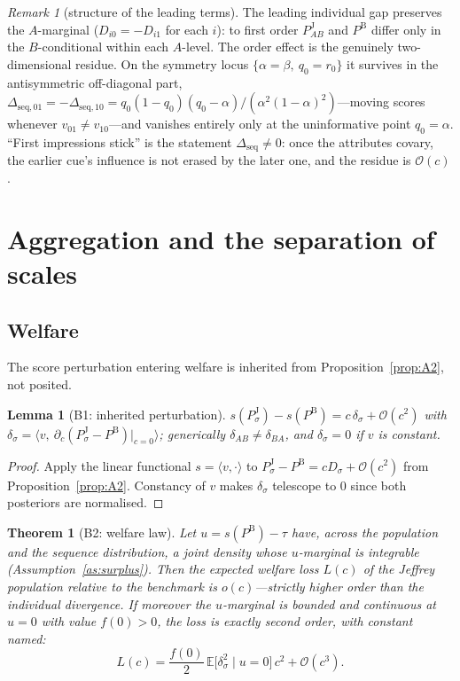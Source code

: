\documentclass[review,12pt,authoryear]{elsarticle}
\newtheorem{lemma}{Lemma}
\newtheorem{theorem}{Theorem}
\theoremstyle{remark}
\newtheorem{remark}{Remark}
\theoremstyle{definition}
\newcommand{\PB}{P^{\mathrm{B}}}
\newcommand{\PJ}{P^{\mathrm{J}}}
\newcommand{\E}{\mathbb{E}}
\newcommand{\bigO}{\mathcal{O}}
\newcommand{\vv}{v}
\newcommand{\anchor}[1]{}
\begin{document}
\begin{remark}[structure of the leading terms]\label{rem:structure}
The leading individual gap preserves the $A$-marginal ($D_{i0}=-D_{i1}$ for each $i$): to first
order $\PJ_{AB}$ and $\PB$ differ only in the $B$-conditional within each $A$-level. The order
effect is the genuinely two-dimensional residue. On the symmetry locus
$\{\alpha=\beta,\ q_0=r_0\}$ it survives in the antisymmetric off-diagonal part,
$\Delta_{\mathrm{seq},01}=-\Delta_{\mathrm{seq},10}
=q_0(1-q_0)(q_0-\alpha)/(\alpha^{2}(1-\alpha)^{2})$---moving scores whenever
$v_{01}\neq v_{10}$---and vanishes entirely only at the uninformative point $q_0=\alpha$.
``First impressions stick'' is the statement $\Delta_{\mathrm{seq}}\neq0$: once the attributes
covary, the earlier cue's influence is not erased by the later one, and the residue is
$\bigO(c)$. \anchor{Prop.~A2}
\end{remark}


\section{Aggregation and the separation of scales}
\label{sec:aggregation}

\subsection{Welfare}
\label{sec:welfare}

The score perturbation entering welfare is inherited from Proposition~\ref{prop:A2}, not
posited.

\begin{lemma}[B1: inherited perturbation]\label{lem:B1}
$s(\PJ_\sigma)-s(\PB)=c\,\delta_\sigma+\bigO(c^{2})$ with
$\delta_\sigma=\big\langle\vv,\ \partial_c(\PJ_\sigma-\PB)|_{c=0}\big\rangle$; generically
$\delta_{AB}\neq\delta_{BA}$, and $\delta_\sigma=0$ if $\vv$ is constant. \anchor{Lem.~B1}
\end{lemma}

\begin{proof}
Apply the linear functional $s=\langle\vv,\cdot\rangle$ to
$\PJ_\sigma-\PB=cD_\sigma+\bigO(c^2)$ from Proposition~\ref{prop:A2}. Constancy of $\vv$ makes
$\delta_\sigma$ telescope to $0$ since both posteriors are normalised.
\end{proof}

\begin{theorem}[B2: welfare law]\label{thm:B2}
Let $u=s(\PB)-\tau$ have, across the population and the sequence distribution, a joint density
whose $u$-marginal is integrable (Assumption~\ref{as:surplus}). Then the expected welfare loss $L(c)$ of the Jeffrey
population relative to the benchmark is $o(c)$---strictly higher order than the individual
divergence. If moreover the $u$-marginal is bounded and continuous at $u=0$ with value
$f(0)>0$, the loss is exactly second order, with constant named:
\[
  L(c)=\frac{f(0)}{2}\,\E\!\big[\delta_\sigma^{2}\mid u=0\big]\,c^{2}+\bigO(c^{3}).
\]
\anchor{Thm.~B2}
\end{theorem}
\end{document}
